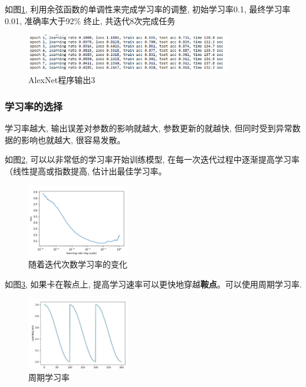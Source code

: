 \documentclass[a4paper]{article}
\begin{document}
如图\ref{AlexOutput3}, 利用余弦函数的单调性来完成学习率的调整, 初始学习率0.1, 最终学习率0.01, 准确率大于92\% 终止, 共迭代8次完成任务
\begin{figure}[!ht]
    \center
\includegraphics[width=0.8\textwidth]{alex_output4.png}
\caption{AlexNet程序输出3}
\label{AlexOutput3}

\end{figure}

\subsubsection{学习率的选择}

学习率越大, 输出误差对参数的影响就越大, 参数更新的就越快, 但同时受到异常数据的影响也就越大, 很容易发散。

如图\ref{lrselect}, 可以以非常低的学习率开始训练模型, 在每一次迭代过程中逐渐提高学习率（线性提高或指数提高, 估计出最佳学习率。 

\begin{figure}[!ht]
    \center
\includegraphics[width=0.4\textwidth]{lrselect.png}
\caption{随着迭代次数学习率的变化}
\label{lrselect}

\end{figure}


如图\ref{cyclelr}, 如果卡在鞍点上, 提高学习速率可以更快地穿越\textbf{鞍点}。可以使用周期学习率.
\begin{figure}[!ht]
    \center
\includegraphics[width=0.4\textwidth]{cyclelr.png}
\caption{周期学习率}
\label{cyclelr}

\end{figure}
\end{document}
